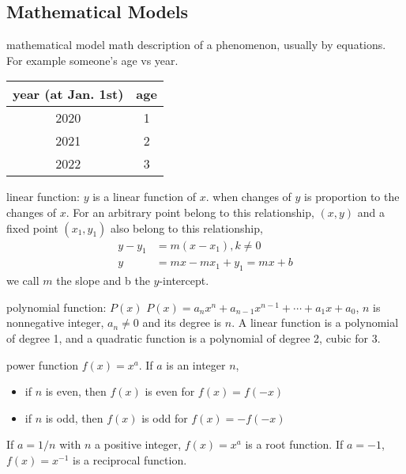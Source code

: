 \documentclass[Calculus 1 Recitation.tex]{subfiles}
\begin{document}
\subsection{Mathematical Models}
\begin{myleftlinebox}
	mathematical model
	\tcblower
	math description of a phenomenon, usually by equations. For example someone's age vs year.
	\begin{center}
		\begin{tabular}{c|c}
			\hline
			year (at Jan. 1st) & age \\\hline
			2020 & 1\\
			2021 & 2\\
			2022 & 3\\
			\hline
		\end{tabular}
	\end{center}
\end{myleftlinebox}

\begin{myleftlinebox}
	linear function: $y$ is a linear function of $x$.
	\tcblower
	when changes of $y$ is proportion to the changes of $x$. For an arbitrary point belong to this relationship, $(x,y)$ and a fixed point $(x_1,y_1)$ also belong to this relationship,
	\begin{align*}
		y-y_1 &= m(x-x_1),k\neq 0\\
		y &= mx-mx_1+y_1 = mx+b
	\end{align*}
	we call $m$ the slope and b the $y$-intercept.
\end{myleftlinebox}

\begin{myleftlinebox}
	polynomial function: $P(x)$
	\tcblower
	$P(x) = a_n x^{n}+a_{n-1} x^{n-1}+\cdots+a_1 x + a_0$, $n$ is nonnegative integer, $a_n\neq 0$ and its degree is $n$. A linear function is a polynomial of degree 1, and a quadratic function is a polynomial of degree 2, cubic for 3.
\end{myleftlinebox}

\begin{myleftlinebox}
	power function
	\tcblower
	$f(x) = x^a$. If $a$ is an integer $n$,
	\begin{itemize}
		\item if $n$ is even, then $f(x)$ is even for $f(x)=f(-x)$
		\item if $n$ is odd, then $f(x)$ is odd for $f(x)=-f(-x)$
	\end{itemize}	
	If $a=1/n$ with $n$ a positive integer, $f(x)=x^a$ is a root function. If $a=-1$, $f(x)=x^{-1}$ is a reciprocal function.
\end{myleftlinebox}
\end{document}

